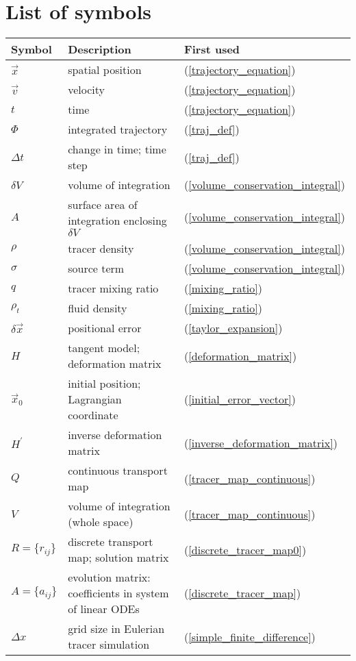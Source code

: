
\section*{List of symbols}


\begin{tabular}{lll}
	Symbol & Description & First used \\ \hline
	$\vec x$ & spatial position & (\ref{trajectory_equation})\\
	$\vec v$ & velocity & (\ref{trajectory_equation})\\
	$t$ & time & (\ref{trajectory_equation})\\
	$\Phi$ & integrated trajectory & (\ref{traj_def}) \\
	$\Delta t$ & change in time; time step & (\ref{traj_def}) \\
	$\delta V$ & volume of integration & (\ref{volume_conservation_integral})\\
	$A$ & surface area of integration enclosing $\delta V$ & (\ref{volume_conservation_integral})\\
	$\rho$ & tracer density & (\ref{volume_conservation_integral})\\
	$\sigma$ & source term & (\ref{volume_conservation_integral})\\
	$q$ & tracer mixing ratio & (\ref{mixing_ratio})\\
	$\rho_t$ & fluid density & (\ref{mixing_ratio})\\
	$\delta \vec x$ & positional error & (\ref{taylor_expansion})\\
	$H$ & tangent model; deformation matrix & (\ref{deformation_matrix})\\
	$\vec x_0$ & initial position; Lagrangian coordinate & (\ref{initial_error_vector})\\
	$H^\prime$ & inverse deformation matrix & (\ref{inverse_deformation_matrix})\\
	$Q$ & continuous transport map & (\ref{tracer_map_continuous}) \\
	$V$ & volume of integration (whole space) & (\ref{tracer_map_continuous}) \\
	$R=\lbrace r_{ij} \rbrace$ & discrete transport map; solution matrix & (\ref{discrete_tracer_map0}) \\
	$A=\lbrace a_{ij} \rbrace$ & evolution matrix: coefficients in system of linear ODEs & (\ref{discrete_tracer_map}) \\
	$\Delta x$ & grid size in Eulerian tracer simulation & (\ref{simple_finite_difference}) \\

\end{tabular}
